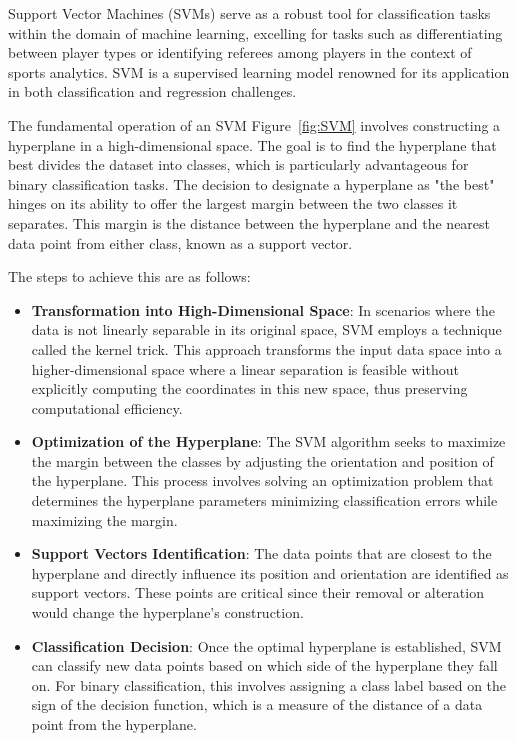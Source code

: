 \documentclass[12pt, letterpaper]{article}
\begin{document}
{\begin{spacing}{1.2}
Support Vector Machines (SVMs) serve as a robust tool for classification tasks within the domain of machine learning, excelling for tasks such as differentiating between player types or identifying referees among players in the context of sports analytics. SVM is a supervised learning model renowned for its application in both classification and regression challenges.

The fundamental operation of an SVM Figure~\ref{fig:SVM} involves constructing a hyperplane in a high-dimensional space. The goal is to find the hyperplane that best divides the dataset into classes, which is particularly advantageous for binary classification tasks. The decision to designate a hyperplane as "the best" hinges on its ability to offer the largest margin between the two classes it separates. This margin is the distance between the hyperplane and the nearest data point from either class, known as a support vector.

The steps to achieve this are as follows:

\begin{itemize}
    \item \textbf{Transformation into High-Dimensional Space}: In scenarios where the data is not linearly separable in its original space, SVM employs a technique called the kernel trick. This approach transforms the input data space into a higher-dimensional space where a linear separation is feasible without explicitly computing the coordinates in this new space, thus preserving computational efficiency.

    \item \textbf{Optimization of the Hyperplane}: The SVM algorithm seeks to maximize the margin between the classes by adjusting the orientation and position of the hyperplane. This process involves solving an optimization problem that determines the hyperplane parameters minimizing classification errors while maximizing the margin.

    \item \textbf{Support Vectors Identification}: The data points that are closest to the hyperplane and directly influence its position and orientation are identified as support vectors. These points are critical since their removal or alteration would change the hyperplane's construction.

    \item \textbf{Classification Decision}: Once the optimal hyperplane is established, SVM can classify new data points based on which side of the hyperplane they fall on. For binary classification, this involves assigning a class label based on the sign of the decision function, which is a measure of the distance of a data point from the hyperplane.
\end{itemize}


\end{spacing}}
\end{document}
